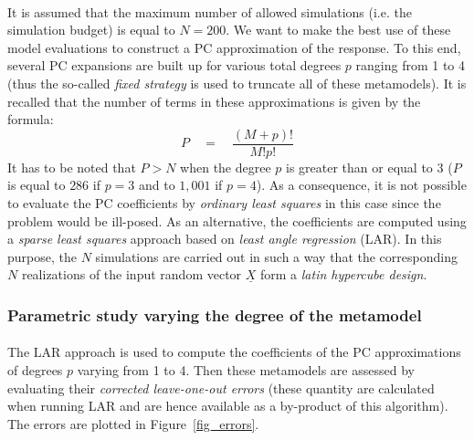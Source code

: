 \documentclass[11pt]{article}
\begin{document}
\paragraph{}
It is assumed that the maximum number of allowed simulations (i.e. the simulation budget) is equal to $N=200$. We want to make the best use of these model evaluations to construct a PC approximation of the response. To this end, several PC expansions are built up for various total degrees $p$ ranging from 1 to 4 (thus the so-called \emph{fixed strategy} is used to truncate all of these metamodels). It is recalled that the number of terms in these approximations is given by the formula:
\begin{equation}
P \quad = \quad \frac{(M+p)!}{M!p!}
\end{equation} 
It has to be noted that $P>N$ when the degree $p$ is greater than or equal to 3 ($P$ is equal to $286$ if $p=3$ and to $1,001$ if $p=4$). As a consequence, it is not possible to evaluate the PC coefficients by \emph{ordinary least squares} in this case since the problem would be ill-posed. As an alternative, the coefficients are computed using a \emph{sparse least squares} approach based on \emph{least angle regression} (LAR). In this purpose, the $N$ simulations are carried out in such a way that the corresponding $N$ realizations of the input random vector $\underline{X}$ form a \emph{latin hypercube design}.

\subsubsection{Parametric study varying the degree of the metamodel}

\paragraph{}
The LAR approach is used to compute the coefficients of the PC approximations of degrees $p$ varying from 1 to 4. Then these metamodels are assessed by evaluating their \emph{corrected leave-one-out errors} (these quantity are calculated when running LAR and are hence available as a by-product of this algorithm). The errors are plotted in Figure~\ref{fig_errors}. 
\end{document}
